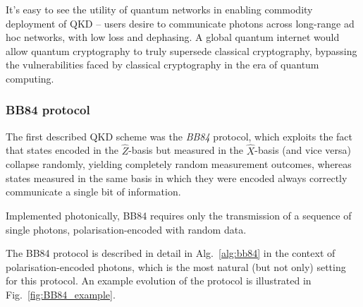 It's easy to see the utility of quantum networks in enabling commodity deployment of QKD -- users desire to communicate photons across long-range ad hoc networks, with low loss and dephasing. A global quantum internet would allow quantum cryptography to truly supersede classical cryptography, bypassing the vulnerabilities faced by classical cryptography in the era of quantum computing.

%
%

\subsubsection{BB84 protocol}

The first described QKD scheme was the \textit{BB84} \cite{bib:BennetBrassard84} protocol, which exploits the fact that states encoded in the $\hat{Z}$-basis but measured in the $\hat{X}$-basis (and vice versa) collapse randomly, yielding completely random measurement outcomes, whereas states measured in the same basis in which they were encoded always correctly communicate a single bit of information.

Implemented photonically, BB84 requires only the transmission of a sequence of single photons, polarisation-encoded with random data.

The BB84 protocol is described in detail in Alg.~\ref{alg:bb84} in the context of polarisation-encoded photons, which is the most natural (but not only) setting for this protocol. An example evolution of the protocol is illustrated in Fig.~\ref{fig:BB84_example}.

